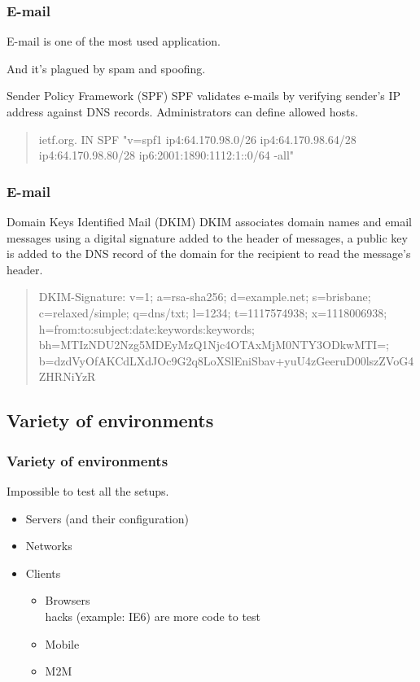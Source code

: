 \begin{frame}
\frametitle{E-mail}
\begin{center}
E-mail is one of the most used application.
\par
And it's plagued by spam and spoofing.
\end{center}
\begin{block}{Sender Policy Framework (SPF)}
SPF validates e-mails by verifying sender's IP address against DNS records.
Administrators can define allowed hosts.
\begin{quote}
ietf.org. IN SPF "v=spf1 ip4:64.170.98.0/26 ip4:64.170.98.64/28 ip4:64.170.98.80/28 ip6:2001:1890:1112:1::0/64 -all"
\end{quote}
\end{block}
\end{frame}

\begin{frame}
\frametitle{E-mail}
\begin{block}{Domain Keys Identified Mail (DKIM)}
DKIM associates domain names and email messages using a digital signature
added to the header of messages, a public key is added to the DNS record of the
domain for the recipient to read the message's header.
\begin{quote}
DKIM-Signature: v=1; a=rsa-sha256; d=example.net; s=brisbane;
c=relaxed/simple; q=dns/txt; l=1234; t=1117574938; x=1118006938;
h=from:to:subject:date:keywords:keywords;
bh=MTIzNDU2Nzg5MDEyMzQ1Njc4OTAxMjM0NTY3ODkwMTI=;
b=dzdVyOfAKCdLXdJOc9G2q8LoXSlEniSbav+yuU4zGeeruD00lszZVoG4ZHRNiYzR
\end{quote}
\end{block}
\end{frame}

\subsection{Variety of environments}

\begin{frame}
\frametitle{Variety of environments}
\begin{center}
Impossible to test all the setups.
\end{center}
\begin{itemize}
\item Servers \small{(and their configuration)}
\item Networks
\item Clients
	\begin{itemize}
	\item Browsers
		\\ hacks \small{(example: IE6)} are more code to test
	\item Mobile
	\item M2M %
	\end{itemize}
\end{itemize}
\end{frame}

